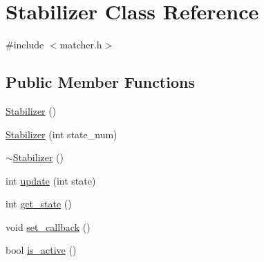 \hypertarget{class_stabilizer}{
\section{Stabilizer Class Reference}
\label{class_stabilizer}
}


{\ttfamily \#include $<$matcher.h$>$}

\subsection*{Public Member Functions}
\begin{DoxyCompactItemize}
\item 
\hyperlink{class_stabilizer_ab9b3726e4013e403e2acdf15a2e84b7d}{Stabilizer} ()
\item 
\hyperlink{class_stabilizer_a2952ab40caf472feb8507bba81206294}{Stabilizer} (int state\_\-num)
\item 
\hyperlink{class_stabilizer_a4ce647343b82fd5ef942407a13fc748a}{$\sim$Stabilizer} ()
\item 
int \hyperlink{class_stabilizer_af417ac1f22ed249d6dbd878a0d6e7907}{update} (int state)
\item 
int \hyperlink{class_stabilizer_ad0997d0f6d19288c0f00f1ec490b7efd}{get\_\-state} ()
\item 
void \hyperlink{class_stabilizer_a07ef8a0a3c59271b0fe271af0807c6c2}{set\_\-callback} ()
\item 
bool \hyperlink{class_stabilizer_accffa026250013a4023fb2594bc74a31}{is\_\-active} ()
\end{DoxyCompactItemize}


